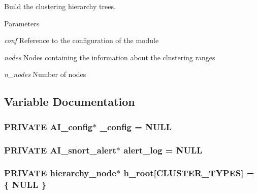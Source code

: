 Build the clustering hierarchy trees. 


\begin{DoxyParams}{Parameters}
\item[{\em conf}]Reference to the configuration of the module \item[{\em nodes}]Nodes containing the information about the clustering ranges \item[{\em n\_\-nodes}]Number of nodes \end{DoxyParams}


\subsection{Variable Documentation}
\hypertarget{group__cluster_ga91458e2d34595688e39fcb63ba418849}{
\subsubsection[{\_\-config}]{\setlength{\rightskip}{0pt plus 5cm}PRIVATE {\bf AI\_\-config}$\ast$ {\bf \_\-config} = NULL}}
\label{group__cluster_ga91458e2d34595688e39fcb63ba418849}
\hypertarget{group__cluster_gaaf4c19f60f48741b0890c6114dcff7d9}{
\subsubsection[{alert\_\-log}]{\setlength{\rightskip}{0pt plus 5cm}PRIVATE {\bf AI\_\-snort\_\-alert}$\ast$ {\bf alert\_\-log} = NULL}}
\label{group__cluster_gaaf4c19f60f48741b0890c6114dcff7d9}
\hypertarget{group__cluster_ga97d35425cf5a0207fb50b64ee8cdda82}{
\subsubsection[{h\_\-root}]{\setlength{\rightskip}{0pt plus 5cm}PRIVATE {\bf hierarchy\_\-node}$\ast$ {\bf h\_\-root}\mbox{[}CLUSTER\_\-TYPES\mbox{]} = \{ NULL \}}}
\label{group__cluster_ga97d35425cf5a0207fb50b64ee8cdda82}

